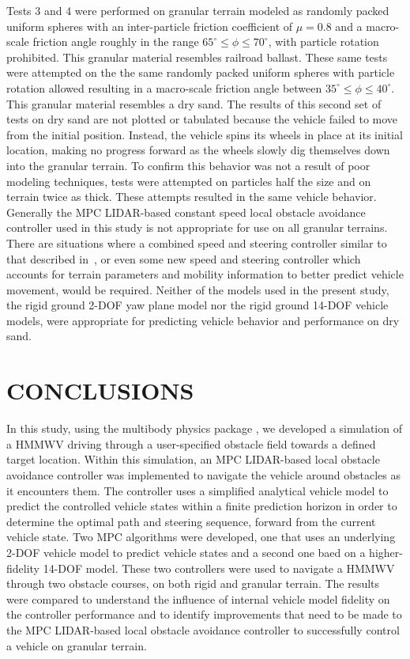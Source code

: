 \documentclass[12pt,twocolumn]{article}
\newcommand{\CHRONO}{{\sffamily{{Chrono}}}}
\begin{document}
Tests 3 and 4 were performed on granular terrain modeled as randomly packed uniform spheres with an inter-particle friction coefficient of $\mu = 0.8$ and a macro-scale friction angle roughly in the range $65^\circ \leq \phi \leq 70^\circ$, with particle rotation prohibited. This granular material resembles railroad ballast. These same tests were attempted on the the same randomly packed uniform spheres with particle rotation allowed resulting in a macro-scale friction angle between $35^\circ \leq \phi \leq 40^\circ$. This granular material resembles a dry sand. The results of this second set of tests on dry sand are not plotted or tabulated because the vehicle failed to move from the initial position. Instead, the vehicle spins its wheels in place at its initial location, making no progress forward as the wheels slowly dig themselves down into the granular terrain. To confirm this behavior was not a result of poor modeling techniques, tests were attempted on particles half the size and on terrain twice as thick. These attempts resulted in the same vehicle behavior. Generally the MPC LIDAR-based constant speed local obstacle avoidance controller used in this study is not appropriate for use on all granular terrains. There are situations where a combined speed and steering controller similar to that described in~\cite{SpeedSteer2015}, or even some new speed and steering controller which accounts for terrain parameters and mobility information to better predict vehicle movement, would be required. Neither of the models used in the present study, the rigid ground 2-DOF yaw plane model nor the rigid ground 14-DOF vehicle models, were appropriate for predicting vehicle behavior and performance on dry sand.



\section{CONCLUSIONS}\label{s:conclusion}

In this study, using the multibody physics package {\CHRONO}, we developed a simulation of a HMMWV driving through a user-specified obstacle field towards a defined target location. Within this simulation, an MPC LIDAR-based local obstacle avoidance controller was implemented to navigate the vehicle around obstacles as it encounters them. The controller uses a simplified analytical vehicle model to predict the controlled vehicle states within a finite prediction horizon in order to determine the optimal path and steering sequence, forward from the current vehicle state. Two MPC algorithms were developed, one that uses an underlying 2-DOF vehicle model to predict vehicle states and a second one baed on a higher-fidelity 14-DOF model. These two controllers were used to navigate a {\CHRONO} HMMWV through two obstacle courses, on both rigid and granular terrain. The results were compared to understand the influence of internal vehicle model fidelity on the controller performance and to identify improvements that need to be made to the MPC LIDAR-based local obstacle avoidance controller to successfully control a vehicle on granular terrain. 
\end{document}

